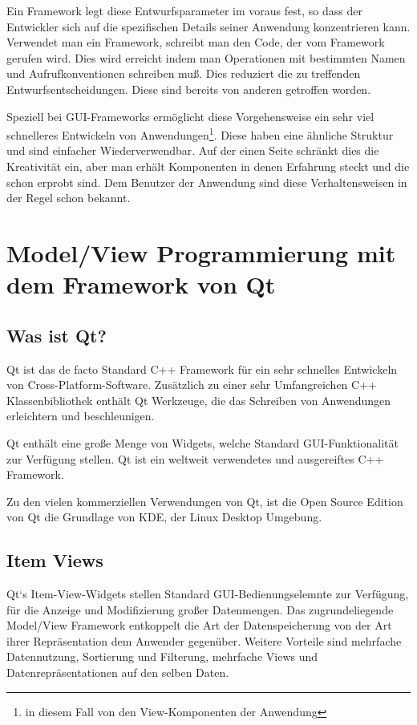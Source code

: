 \documentclass[11pt,a4paper,titlepage]{scrreprt}
\begin{document}
Ein Framework legt diese Entwurfsparameter im voraus fest, so dass der Entwickler
sich auf die spezifischen Details seiner Anwendung konzentrieren kann.
Verwendet man ein Framework, schreibt man den Code, der vom Framework gerufen wird.
Dies wird erreicht indem man Operationen mit bestimmten Namen und Aufrufkonventionen
schreiben muß. Dies reduziert die zu treffenden Entwurfsentscheidungen. Diese sind
bereits von anderen getroffen worden.

Speziell bei GUI-Frameworks ermöglicht diese Vorgehensweise ein sehr viel schnelleres
Entwickeln von Anwendungen\footnote{in diesem Fall von den View-Komponenten
der Anwendung}. Diese haben eine ähnliche Struktur und sind einfacher Wiederverwendbar.
Auf der einen Seite schränkt dies die Kreativität ein, aber man erhält Komponenten 
in denen Erfahrung steckt und die schon erprobt sind. Dem Benutzer der Anwendung sind
diese Verhaltensweisen in der Regel schon bekannt.

\chapter{Model/View Programmierung mit dem Framework von Qt}
\section{Was ist Qt?}
Qt ist das de facto Standard C++ Framework für ein sehr schnelles Entwickeln von
Cross-Platform-Software. Zusätzlich zu einer sehr Umfangreichen C++ Klassenbibliothek
enthält Qt Werkzeuge, die das Schreiben von Anwendungen erleichtern und
beschleunigen.

Qt enthält eine große Menge von Widgets, welche Standard GUI-Funktionalität zur
Verfügung stellen. Qt ist ein weltweit verwendetes und ausgereiftes C++ Framework.

Zu den vielen kommerziellen Verwendungen von Qt, ist die Open Source Edition
von Qt die Grundlage von KDE, der Linux Desktop Umgebung.

\section{Item Views}
Qt`s Item-View-Widgets stellen Standard GUI-Bedienungselemnte zur Verfügung, für die
Anzeige und Modifizierung großer Datenmengen. Das zugrundeliegende Model/View Framework
entkoppelt die Art der Datenspeicherung von der Art ihrer Repräsentation dem Anwender
gegenüber. Weitere Vorteile sind mehrfache Datennutzung, Sortierung und Filterung,
mehrfache Views und Datenrepräsentationen auf den selben Daten.
\end{document}
